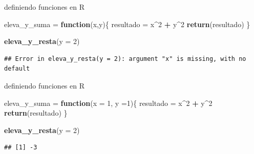 \documentclass[ignorenonframetext,]{beamer}
\newenvironment{Shaded}{\begin{snugshade}}{\end{snugshade}}
\newcommand{\ControlFlowTok}[1]{\textcolor[rgb]{0.13,0.29,0.53}{\textbf{#1}}}
\newcommand{\DataTypeTok}[1]{\textcolor[rgb]{0.13,0.29,0.53}{#1}}
\newcommand{\DecValTok}[1]{\textcolor[rgb]{0.00,0.00,0.81}{#1}}
\newcommand{\KeywordTok}[1]{\textcolor[rgb]{0.13,0.29,0.53}{\textbf{#1}}}
\newcommand{\NormalTok}[1]{#1}
\newcommand{\OperatorTok}[1]{\textcolor[rgb]{0.81,0.36,0.00}{\textbf{#1}}}
\newcommand{\StringTok}[1]{\textcolor[rgb]{0.31,0.60,0.02}{#1}}
\begin{document}
\begin{frame}[fragile]{definiendo funciones en R}
\protect\hypertarget{definiendo-funciones-en-r-4}{}

\begin{Shaded}
\begin{Highlighting}[]
\NormalTok{eleva_y_suma =}\StringTok{ }\ControlFlowTok{function}\NormalTok{(x,y)\{}
\NormalTok{  resultado =}\StringTok{ }\NormalTok{x}\OperatorTok{^}\DecValTok{2} \OperatorTok{+}\StringTok{ }\NormalTok{y}\OperatorTok{^}\DecValTok{2}
  \KeywordTok{return}\NormalTok{(resultado)}
\NormalTok{\}}

\KeywordTok{eleva_y_resta}\NormalTok{(}\DataTypeTok{y =} \DecValTok{2}\NormalTok{)}
\end{Highlighting}
\end{Shaded}

\begin{verbatim}
## Error in eleva_y_resta(y = 2): argument "x" is missing, with no default
\end{verbatim}

\end{frame}

\begin{frame}[fragile]{definiendo funciones en R}
\protect\hypertarget{definiendo-funciones-en-r-5}{}

\begin{Shaded}
\begin{Highlighting}[]
\NormalTok{eleva_y_suma =}\StringTok{ }\ControlFlowTok{function}\NormalTok{(}\DataTypeTok{x =} \DecValTok{1}\NormalTok{, }\DataTypeTok{y =}\DecValTok{1}\NormalTok{)\{}
\NormalTok{  resultado =}\StringTok{ }\NormalTok{x}\OperatorTok{^}\DecValTok{2} \OperatorTok{+}\StringTok{ }\NormalTok{y}\OperatorTok{^}\DecValTok{2}
  \KeywordTok{return}\NormalTok{(resultado)}
\NormalTok{\}}

\KeywordTok{eleva_y_resta}\NormalTok{(}\DataTypeTok{y =} \DecValTok{2}\NormalTok{)}
\end{Highlighting}
\end{Shaded}

\begin{verbatim}
## [1] -3
\end{verbatim}

\end{frame}
\end{document}
